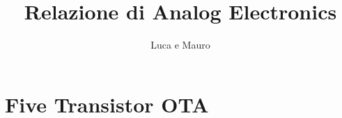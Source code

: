 \documentclass[12pt, a4paper, twoside, openany]{article}
\title{Relazione di Analog Electronics} %
\author{Luca e Mauro }
\begin{document}
\maketitle

\section[First Lab: 5 Transistor OTA]{Five Transistor OTA}
\end{document}
